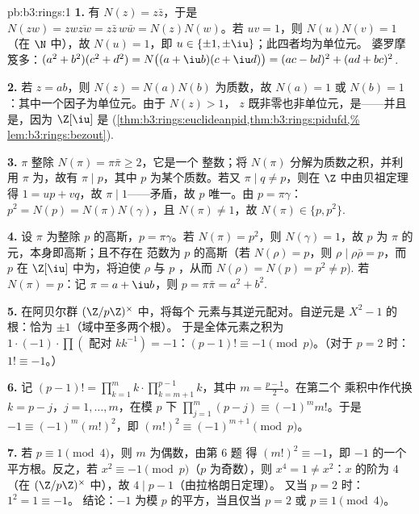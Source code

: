\begin{solution}{pb:b3:rings:1}
\textbf{1.} 有 $N(z) = z\bar z$，于是 $N(zw) = zw\overline{zw} = z\bar
z\, w \bar w = N(z)N(w)$。若 $uv = 1$，则 $N(u)N(v) = 1$（在 $\N$ 中），故
$N(u) = 1$，即 $u \in \{\pm 1, \pm \iu\}$；此四者均为单位元。
婆罗摩笈多：$(a^2+b^2)(c^2+d^2) = N\bigl((a + \iu b)(c + \iu
d)\bigr) = (ac - bd)^2 + (ad + bc)^2$.

\textbf{2.} 若 $z = ab$，则 $N(z) = N(a)N(b)$ 为质数，故
$N(a) = 1$ 或 $N(b) = 1$：其中一个因子为单位元。由于 $N(z) > 1$，
$z$ 既非零也非单位元，是——并且是，因为
$\Z[\iu]$ 是
(\cref{thm:b3:rings:euclideanpid,thm:b3:rings:pidufd,%
lem:b3:rings:bezout}).

\textbf{3.} $\pi$ 整除 $N(\pi) = \pi\bar\pi \geq 2$，它是一个
整数；将 $N(\pi)$ 分解为质数之积，并利用
$\pi$ 为，故有 $\pi \mid p$，其中 $p$ 为某个质数。若又
$\pi \mid q \neq p$，则在 $\Z$ 中由贝祖定理得 $1 = up + vq$，故
$\pi \mid 1$——矛盾，故 $p$ 唯一。由 $p = \pi\gamma$：
$p^2 = N(p) = N(\pi)N(\gamma)$，且 $N(\pi) \neq 1$，故 $N(\pi)
\in \{p, p^2\}$.

\textbf{4.} 设 $\pi$ 为整除 $p$ 的高斯，$p =
\pi\gamma$。若 $N(\pi) = p^2$，则 $N(\gamma) = 1$，故 $p$ 为
$\pi$ 的元，本身即高斯；且不存在
范数为 $p$ 的高斯（若 $N(\rho) = p$，则 $\rho \mid
\rho\bar\rho = p$，而 $p$ 在 $\Z[\iu]$ 中为，将迫使
$\rho$ 与 $p$ ，从而 $N(\rho) = N(p) = p^2 \neq
p$).
若 $N(\pi) = p$：记 $\pi = a + \iu b$，则 $p = \pi\bar\pi = a^2
+ b^2$.

\textbf{5.} 在阿贝尔群 $(\Z/p\Z)^\times$ 中，将每个
元素与其逆元配对。自逆元是
$X^2 - 1$ 的根：恰为 $\pm 1$（域中至多两个根）。
于是全体元素之积为 $1 \cdot (-1) \cdot \prod
(\text{ 配对 } k k^{-1}) = -1$：$(p-1)! \equiv -1 \pmod p$。（对于
$p = 2$ 时：$1! \equiv -1$。）

\textbf{6.} 记 $(p-1)! = \prod_{k=1}^m k \cdot
\prod_{k=m+1}^{p-1}k$，其中 $m = \frac{p-1}2$。在第二个
乘积中作代换 $k = p - j$，$j = 1, \dots, m$，在模 $p$ 下
$\prod_{j=1}^m (p - j) \equiv (-1)^m m!$。于是 $-1 \equiv
(-1)^m (m!)^2$，即 $(m!)^2 \equiv (-1)^{m+1} \pmod p$。

\textbf{7.} 若 $p \equiv 1 \pmod 4$，则 $m$ 为偶数，由第 6 题
得 $(m!)^2 \equiv -1$，即 $-1$ 的一个平方根。反之，若
$x^2 \equiv -1 \pmod p$（$p$ 为奇数），则 $x^4 = 1 \neq x^2$：$x$
的阶为 $4$（在 $(\Z/p\Z)^\times$ 中），故 $4 \mid p - 1$（由拉格朗日定理）。
又当 $p = 2$ 时：$1^2 = 1 \equiv -1$。
结论：$-1$ 为模 $p$ 的平方，当且仅当 $p = 2$ 或 $p \equiv 1 \pmod 4$。


\end{solution}
